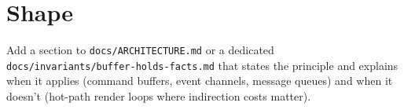 \section{Shape}\label{record-365-shape}

Add a section to \texttt{d\allowbreak{}o\allowbreak{}c\allowbreak{}s\allowbreak{}/\allowbreak{}A\allowbreak{}R\allowbreak{}C\allowbreak{}H\allowbreak{}I\allowbreak{}T\allowbreak{}E\allowbreak{}C\allowbreak{}T\allowbreak{}U\allowbreak{}R\allowbreak{}E\allowbreak{}.\allowbreak{}m\allowbreak{}d} or a dedicated \texttt{d\allowbreak{}o\allowbreak{}c\allowbreak{}s\allowbreak{}/\allowbreak{}i\allowbreak{}n\allowbreak{}v\allowbreak{}a\allowbreak{}r\allowbreak{}i\allowbreak{}a\allowbreak{}n\allowbreak{}t\allowbreak{}s\allowbreak{}/\allowbreak{}b\allowbreak{}u\allowbreak{}f\allowbreak{}f\allowbreak{}e\allowbreak{}r\allowbreak{}-\allowbreak{}h\allowbreak{}o\allowbreak{}l\allowbreak{}d\allowbreak{}s\allowbreak{}-\allowbreak{}f\allowbreak{}a\allowbreak{}c\allowbreak{}t\allowbreak{}s\allowbreak{}.\allowbreak{}m\allowbreak{}d} that states the principle and explains when it applies (command buffers, event channels, message queues) and when it doesn't (hot-path render loops where indirection costs matter).

